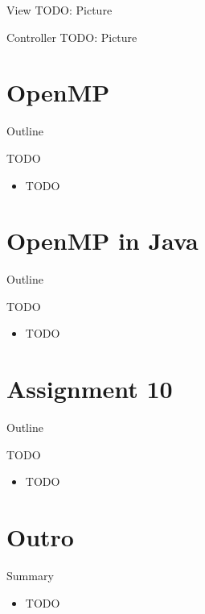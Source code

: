 \begin{frame}{View}
  TODO: Picture
\end{frame}

\begin{frame}{Controller}
  TODO: Picture
\end{frame}


\section{OpenMP}

\begin{frame}{Outline}
  \tableofcontents[current]
\end{frame}

\begin{frame}{TODO}
  \begin{itemize}
  \item TODO
  \end{itemize}
\end{frame}


\section{OpenMP in Java}

\begin{frame}{Outline}
  \tableofcontents[current]
\end{frame}

\begin{frame}{TODO}
  \begin{itemize}
  \item TODO
  \end{itemize}
\end{frame}


\section{Assignment 10}

\begin{frame}{Outline}
  \tableofcontents[current]
\end{frame}

\begin{frame}{TODO}
  \begin{itemize}
  \item TODO
  \end{itemize}
\end{frame}


\section*{Outro}

\begin{frame}{Summary}
  \begin{itemize}
  \item TODO
  \end{itemize}
\end{frame}


